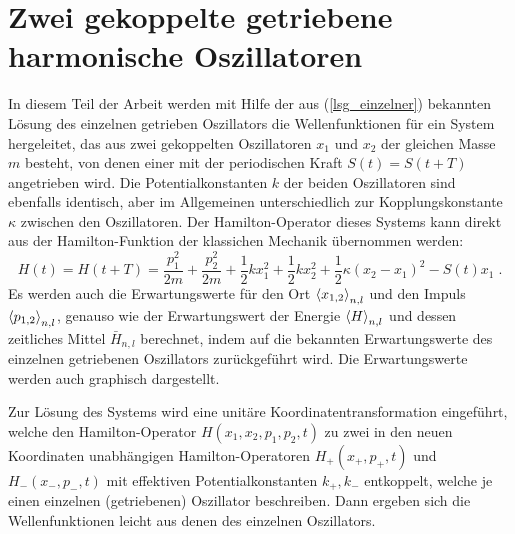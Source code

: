 \chapter{Zwei gekoppelte getriebene harmonische Oszillatoren}


In diesem Teil der Arbeit werden mit Hilfe der aus (\ref{lsg_einzelner}) bekannten Lösung des einzelnen getrieben Oszillators die Wellenfunktionen für ein System hergeleitet, das aus zwei gekoppelten Oszillatoren $x_1$ und $x_2$ der gleichen Masse $m$ besteht, von denen einer mit der periodischen Kraft $S(t) = S(t+T)$ angetrieben wird.
Die Potentialkonstanten $k$ der beiden Oszillatoren sind ebenfalls identisch, aber im Allgemeinen unterschiedlich zur Kopplungskonstante $\kappa$ zwischen den Oszillatoren.
Der Hamilton-Operator dieses Systems kann direkt aus der Hamilton-Funktion  der klassichen Mechanik übernommen werden:
\begin{equation}
  H(t) = H(t+T) = \frac{p_1^2}{2m} + \frac{p_2^2}{2m} + \frac 1 2 kx_1^2 + \frac 1 2 kx_2^2 + \frac 1 2 \kappa(x_2-x_1)^2 - S(t)x_1 \; .
  \label{H_gekoppelt}
\end{equation}
Es werden auch die Erwartungswerte für  den Ort $\braket{x_{1,2}}_{n,l}$ und den Impuls $\braket{p_{1,2}}_{n,l}$, genauso wie der Erwartungswert der Energie $\braket{H}_{n,l}$ und dessen zeitliches Mittel $\bar{H}_{n,l}$ berechnet, indem auf die bekannten Erwartungswerte des einzelnen getriebenen Oszillators zurückgeführt wird.
Die Erwartungswerte werden auch graphisch dargestellt.

Zur Lösung des Systems wird eine unitäre Koordinatentransformation eingeführt, welche den Hamilton-Operator $H(x_1,x_2,p_1,p_2,t)$ zu zwei in den neuen Koordinaten unabhängigen Hamilton-Operatoren $H_+(x_+,p_+,t)$ und $H_-(x_-,p_-,t)$ mit effektiven Potentialkonstanten $k_+,k_-$ entkoppelt, welche je einen einzelnen (getriebenen) Oszillator beschreiben.
Dann ergeben sich die Wellenfunktionen leicht aus denen des einzelnen Oszillators.


